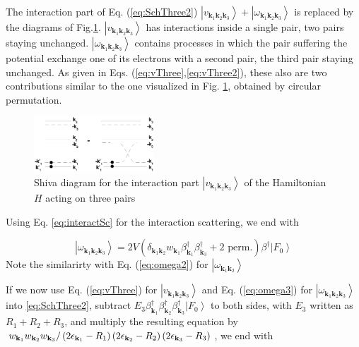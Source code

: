 \documentclass[aps,prb,superscriptaddress,showpacs,reprint,lengthcheck]{revtex4-1}
\begin{document}
The interaction part of Eq. (\ref{eq:SchThree2}) $\left|v_{\mathbf{k} _1\mathbf{k} _2%
\mathbf{k} _3}\right>+\left|\omega_{\mathbf{k} _1\mathbf{k} _2\mathbf{k} _3}\right> $ is replaced by the diagrams of Fig.\ref{fig:threeP}. $\left|v_{\mathbf{k} _1\mathbf{k} _2
\mathbf{k} _3}\right>$ has interactions inside a single pair, two pairs
staying unchanged. $\left|\omega_{\mathbf{k} _1\mathbf{k} _2\mathbf{k} _3}\right> $ contains processes in which the pair suffering the potential exchange one of its electrons with a second pair, the third pair staying unchanged.  \normalsize	As given in Eqs. (\ref{eq:vThree},\ref{eq:vThree2}), these also are two  contributions similar to the one
visualized in Fig. \ref{fig:threeP}, obtained by circular permutation.
\begin{figure}[htb]
   \includegraphics[width=0.4\textwidth]{threePair.eps}
\caption{Shiva diagram for the interaction part $\left|v_{\mathbf{k} _1\mathbf{k} _2%
\mathbf{k} _3}\right> $ of the Hamiltonian $H$ acting on three pairs }\label{fig:threeP}
 \end{figure}

Using Eq. \eqref{eq:interactSc} for the interaction scattering, we end with

\begin{equation}\label{eq:omega3}
\left|\omega_{\mathbf{k} _1\mathbf{k} _2\mathbf{k} _3}\right>= 2V(\delta_{\mathbf{k} _1\mathbf{k} _2}w_{\mathbf{k} _1}\beta^{\dagger}_{\mathbf{k} _1}\beta^{\dagger}_{\mathbf{k} _3}+ \text{2 perm.})\beta^{\dagger}\left|F_0\right>
\end{equation}
Note the similarirty with Eq. (\ref{eq:omega2}) for $\left|\omega_{\mathbf{k} _1\mathbf{k} _2}\right> $



If we now use Eq. (\ref{eq:vThree}) for $\left|v_{\mathbf{k} _1\mathbf{k} _2\mathbf{k} _3}\right> $  and Eq. (\ref{eq:omega3}) for $\left|\omega_{\mathbf{k} _1\mathbf{k} _2\mathbf{k} _3}\right> $ into \eqref{eq:SchThree2}, subtract $E
_3\beta^{\dagger}_{\mathbf{k} _1}\beta^{\dagger}_{\mathbf{k}
_2}\beta^{\dagger}_{\mathbf{k} _3}\left|F_0\right>  $ to both sides, with $%
E _3$ written as $R_1+R_2+R_3$, and multiply the resulting equation
by $w_{\mathbf{k} _1}w_{\mathbf{k} _2}w_{\mathbf{k} _3}/\left(2\epsilon_{%
\mathbf{k} _1}-R_1\right) \left(2\epsilon_{\mathbf{k} _2}-R_2\right)
\left(2\epsilon_{\mathbf{k} _3}-R_3\right) $, we end with
\end{document}
